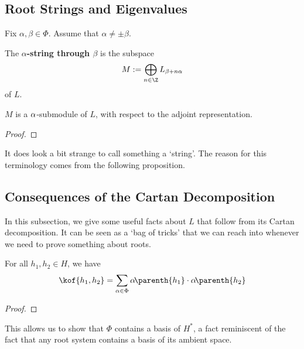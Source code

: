 \subsection{Root Strings and Eigenvalues}

Fix $\alpha, \beta \in \Phi$. Assume that $\alpha \neq \pm \beta$.

\begin{boxdefinition}[Strings]
    The \textbf{$\alpha$-string through $\beta$} is the subspace
    \begin{align*}
        M := \bigoplus_{n \in \Z} L_{\beta + n\alpha}
    \end{align*}
    of $L$.
\end{boxdefinition}

\begin{lemma}
    $M$ is a $\sl{\alpha}$-submodule of $L$, with respect to the adjoint representation.
\end{lemma}
\begin{proof}
    \sorry %
\end{proof}

It does look a bit strange to call something a `string'. The reason for this terminology comes from the following proposition.

\begin{boxproposition}
    \sorry
\end{boxproposition}

\subsection{Consequences of the Cartan Decomposition}

In this subsection, we give some useful facts about $L$ that follow from its Cartan decomposition. It can be seen as a `bag of tricks' that we can reach into whenever we need to prove something about roots.

\begin{boxlemma}
    For all $h_1, h_2 \in H$, we have
    \begin{align*}
        \kof{h_1, h_2} = \sum_{\alpha \in \Phi} \alpha\!\parenth{h_1} \cdot \alpha\!\parenth{h_2}
    \end{align*}
\end{boxlemma}
\begin{proof}
    \sorry
\end{proof}

This allows us to show that $\Phi$ contains a basis of $H^*$, a fact reminiscent of the fact that any root system contains a basis of its ambient space.

